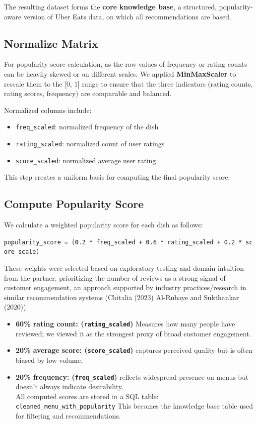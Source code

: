 \documentclass[
  11pt,
  a4paper,
  DIV=11,
  numbers=noendperiod]{scrartcl}
\providecommand{\tightlist}{%
  \setlength{\itemsep}{0pt}\setlength{\parskip}{0pt}}\usepackage{longtable,booktabs,array}
\begin{document}
The resulting dataset forms the \textbf{core knowledge base}, a
structured, popularity-aware version of Uber Eats data, on which all
recommendations are based.

\subsection{Normalize Matrix}\label{normalize-matrix}

For popularity score calculation, as the raw values of frequency or
rating counts can be heavily skewed or on different scales. We applied
\textbf{MinMaxScaler} to rescale them to the {[}0, 1{]} range to ensure
that the three indicators (rating counts, rating scores, frequency) are
comparable and balanced.

Normalized columns include:

\begin{itemize}
\tightlist
\item
  \texttt{freq\_scaled}: normalized frequency of the dish
\item
  \texttt{rating\_scaled}: normalized count of user ratings
\item
  \texttt{score\_scaled}: normalized average user rating
\end{itemize}

This step creates a uniform basis for computing the final popularity
score.

\subsection{Compute Popularity Score}\label{compute-popularity-score}

We calculate a weighted popularity score for each dish as follows:

\texttt{popularity\_score\ =\ (0.2\ *\ freq\_scaled\ +\ 0.6\ *\ rating\_scaled\ +\ 0.2\ *\ score\_scale)}

These weights were selected based on exploratory testing and domain
intuition from the partner, prioritizing the number of reviews as a
strong signal of customer engagement, an approach supported by industry
practices/research in similar recommendation systems (Chitalia (2023)
Al-Rubaye and Sukthankar (2020))

\begin{itemize}
\tightlist
\item
  \textbf{60\% rating count: (\texttt{rating\_scaled})} Measures how
  many people have reviewed; we viewed it as the strongest proxy of
  broad customer engagement.
\item
  \textbf{20\% average score: (\texttt{score\_scaled})} captures
  perceived quality but is often biased by low volume.
\item
  \textbf{20\% frequency: (\texttt{freq\_scaled})} reflects widespread
  presence on menus but doesn't always indicate desirability.\\
  All computed scores are stored in a SQL table:
  \texttt{cleaned\_menu\_with\_popularity} This becomes the knowledge
  base table used for filtering and recommendations.
\end{itemize}
\end{document}
